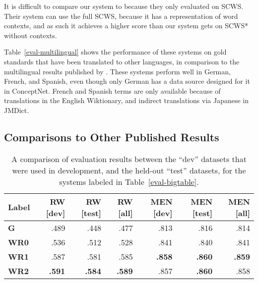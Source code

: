 \documentclass[11pt,letterpaper]{article}
\begin{document}
It is difficult to compare our system to  because they only
evaluated on SCWS. Their system can use the full SCWS, because it has a
representation of word contexts, and as such it achieves a higher score than
our system gets on SCWS* without contexts.

Table~\ref{eval-multilingual} shows the performance of these systems on
gold standards that have been translated to other languages, in comparison to
the multilingual results published by .
These systems perform well in German, French, and Spanish, even though only
German has a data source designed for it in ConceptNet. French and Spanish terms
are only available because of translations in the English Wiktionary, and
indirect translations via Japanese in JMDict.

\subsection{Comparisons to Other Published Results}

\begin{table*}[t]
\centering
\begin{tabular}{lrrrrrr}
\toprule
Label   & RW [dev] & RW [test] & RW [all] & MEN [dev] & MEN [test] & MEN [all]\\
\midrule
\bf G   &    .489  &    .448  &    .477  &    .813  &    .816 &    .814 \\
\bf WR0 &    .536  &    .512  &    .528  &    .841  &    .840 &    .841 \\
\bf WR1 &    .587  &    .581  &    .585  &\bf .858  &\bf .860 &\bf .859 \\
\bf WR2 &\bf .591  &\bf .584  &\bf .589  &    .857  &\bf .860 &    .858 \\
\bottomrule
\end{tabular}

\caption{
    A comparison of evaluation results between the ``dev'' datasets that were
    used in development, and the held-out ``test'' datasets, for the systems
    labeled in Table~\ref{eval-bigtable}.
}
\label{eval-dev-test}
\end{table*}
\end{document}
